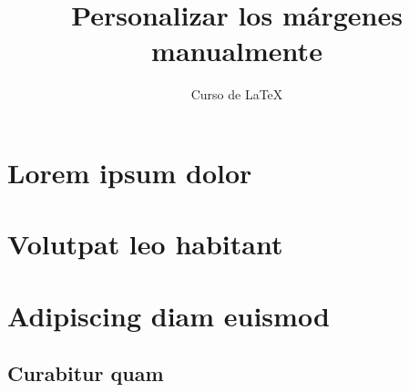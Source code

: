 \documentclass[12pt,letterpaper]{book}
\author{Curso de LaTeX}
\title{Personalizar los márgenes manualmente}
\begin{document}
\frontmatter
\maketitle
\chapter*{Lorem ipsum dolor}
\thispagestyle{empty}
\lipsum
\tableofcontents
\thispagestyle{empty}
\mainmatter
\pagestyle{plain}
 \chapter{Volutpat leo habitant}
\lipsum
 \chapter{Adipiscing diam euismod}
\lipsum[1]
 \section{Curabitur quam}
\lipsum[2]
\end{document}
